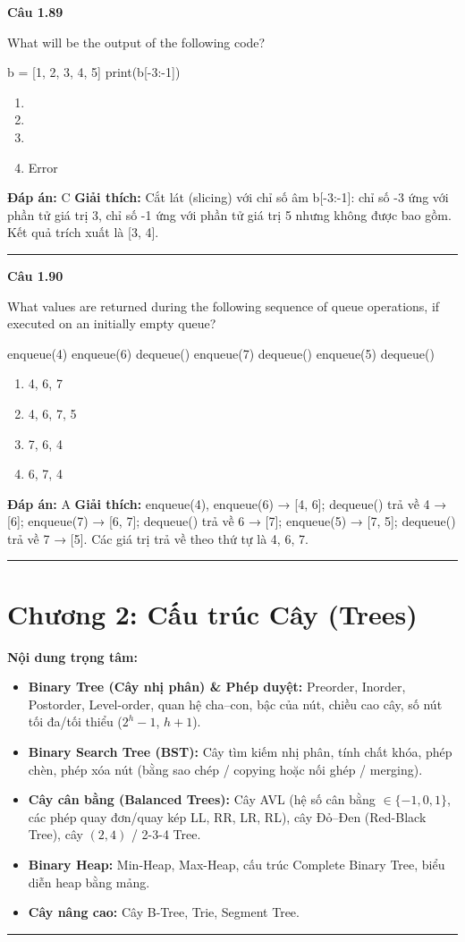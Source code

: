 \documentclass[11pt,a4paper]{article}
\newenvironment{question}[1]{%
  \par\vspace{1em}\noindent\textbf{\large Câu #1}\par\vspace{0.4em}
}{%
  \par\vspace{1em}\hrule\vspace{0.6em}
}
\newenvironment{choices}{%
  \begin{enumerate}[label=\textbf{\Alph*.},leftmargin=2.2em,itemsep=2pt,topsep=3pt]
}{%
  \end{enumerate}
}
\newcommand{\choice}{\item}
\newenvironment{codebox}{%
  \begin{tcolorbox}[colback=gray!8!white,colframe=gray!50!black,arc=1.5mm,boxrule=0.6pt,left=3mm,right=3mm,top=2.5mm,bottom=2.5mm]
  \ttfamily\small
}{%
  \end{tcolorbox}
}
\begin{document}
\begin{question}{1.89}
What will be the output of the following code?
\begin{codebox}
b = [1, 2, 3, 4, 5]
print(b[-3:-1])
\end{codebox}
\begin{choices}
\choice [1]
\choice [2, 3]
\choice [3, 4]
\choice Error
\end{choices}
\textbf{Đáp án:} C
\textbf{Giải thích:} Cắt lát (slicing) với chỉ số âm b[-3:-1]: chỉ số -3 ứng với phần tử giá trị 3, chỉ số -1 ứng với phần tử giá trị 5 nhưng không được bao gồm. Kết quả trích xuất là [3, 4].
\end{question}

\begin{question}{1.90}
What values are returned during the following sequence of queue operations, if executed on an initially empty queue?
\begin{codebox}
enqueue(4)
enqueue(6)
dequeue()
enqueue(7)
dequeue()
enqueue(5)
dequeue()
\end{codebox}
\begin{choices}
\choice 4, 6, 7
\choice 4, 6, 7, 5
\choice 7, 6, 4
\choice 6, 7, 4
\end{choices}
\textbf{Đáp án:} A
\textbf{Giải thích:} enqueue(4), enqueue(6) → [4, 6]; dequeue() trả về 4 → [6]; enqueue(7) → [6, 7]; dequeue() trả về 6 → [7]; enqueue(5) → [7, 5]; dequeue() trả về 7 → [5]. Các giá trị trả về theo thứ tự là 4, 6, 7.
\end{question}

\newpage
\section*{Chương 2: Cấu trúc Cây (Trees)}

\noindent\textbf{Nội dung trọng tâm:}
\begin{itemize}[noitemsep,topsep=3pt]
  \item \textbf{Binary Tree (Cây nhị phân) \& Phép duyệt:} Preorder, Inorder, Postorder, Level-order, quan hệ cha--con, bậc của nút, chiều cao cây, số nút tối đa/tối thiểu ($2^h - 1$, $h + 1$).
  \item \textbf{Binary Search Tree (BST):} Cây tìm kiếm nhị phân, tính chất khóa, phép chèn, phép xóa nút (bằng sao chép / copying hoặc nối ghép / merging).
  \item \textbf{Cây cân bằng (Balanced Trees):} Cây AVL (hệ số cân bằng $\in \{-1, 0, 1\}$, các phép quay đơn/quay kép LL, RR, LR, RL), cây Đỏ--Đen (Red-Black Tree), cây $(2,4)$ / 2-3-4 Tree.
  \item \textbf{Binary Heap:} Min-Heap, Max-Heap, cấu trúc Complete Binary Tree, biểu diễn heap bằng mảng.
  \item \textbf{Cây nâng cao:} Cây B-Tree, Trie, Segment Tree.
\end{itemize}
\bigskip
\hrule
\bigskip
\end{document}
